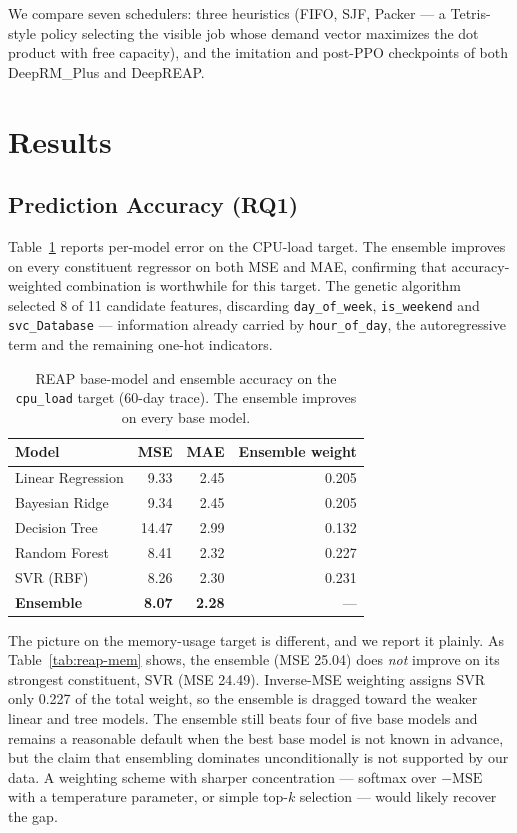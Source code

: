 \documentclass[runningheads]{llncs}
\begin{document}
We compare seven schedulers: three heuristics (FIFO, SJF, Packer ---
a Tetris-style policy selecting the visible job whose demand vector
maximizes the dot product with free capacity), and the imitation and
post-PPO checkpoints of both DeepRM\_Plus and DeepREAP.

\section{Results}

\subsection{Prediction Accuracy (RQ1)}

Table~\ref{tab:reap-cpu} reports per-model error on the CPU-load
target. The ensemble improves on every constituent regressor on both
MSE and MAE, confirming that accuracy-weighted combination is
worthwhile for this target. The genetic algorithm selected 8 of 11
candidate features, discarding \texttt{day\_of\_week},
\texttt{is\_weekend} and \texttt{svc\_Database} --- information
already carried by \texttt{hour\_of\_day}, the autoregressive term and
the remaining one-hot indicators.

\begin{table}[t]
\centering
\caption{REAP base-model and ensemble accuracy on the
\texttt{cpu\_load} target (60-day trace). The ensemble improves on
every base model.}
\label{tab:reap-cpu}
\begin{tabular}{lrrr}
\toprule
\textbf{Model} & \textbf{MSE} & \textbf{MAE} &
\textbf{Ensemble weight} \\
\midrule
Linear Regression & 9.33  & 2.45 & 0.205 \\
Bayesian Ridge    & 9.34  & 2.45 & 0.205 \\
Decision Tree     & 14.47 & 2.99 & 0.132 \\
Random Forest     & 8.41  & 2.32 & 0.227 \\
SVR (RBF)         & 8.26  & 2.30 & 0.231 \\
\midrule
\textbf{Ensemble} & \textbf{8.07} & \textbf{2.28} & --- \\
\bottomrule
\end{tabular}
\end{table}

The picture on the memory-usage target is different, and we report it
plainly. As Table~\ref{tab:reap-mem} shows, the ensemble (MSE 25.04)
does \emph{not} improve on its strongest constituent, SVR (MSE 24.49).
Inverse-MSE weighting assigns SVR only 0.227 of the total weight, so
the ensemble is dragged toward the weaker linear and tree models. The
ensemble still beats four of five base models and remains a reasonable
default when the best base model is not known in advance, but the
claim that ensembling dominates unconditionally is not supported by
our data. A weighting scheme with sharper concentration --- softmax
over $-\mathrm{MSE}$ with a temperature parameter, or simple top-$k$
selection --- would likely recover the gap.
\end{document}
